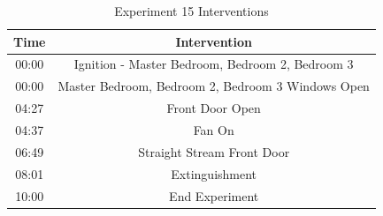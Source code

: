 \documentclass{article}
\begin{document}
\begin{table}[H]
	\centering
	\caption{Experiment 15 Interventions}
	\begin{tabular}{|c|c|} 
		\hline
		Time & Intervention \\ \hline \hline
		00:00 & Ignition - Master Bedroom, Bedroom 2, Bedroom 3 \\ \hline
		00:00 & Master Bedroom, Bedroom 2, Bedroom 3 Windows Open \\ \hline
		04:27 & Front Door Open \\ \hline
		04:37 & Fan On \\ \hline
		06:49 & Straight Stream Front Door \\ \hline
		08:01 & Extinguishment \\ \hline
		10:00 & End Experiment \\ \hline
	\end{tabular}
	\label{Table:Exp15Interventions}
\end{table}
\end{document}
